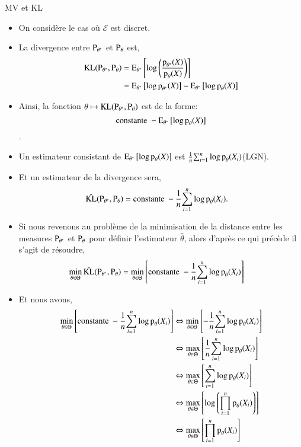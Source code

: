 \begin{frame}
    [allowframebreaks]{MV et KL}
    \begin{itemize}
        \item On considère le cas où $\mathcal{E}$ est discret.
        \item La divergence entre $\operatorname{P}_{\theta^*}$ et $\operatorname{P}_\theta$ est,
        \begin{align*}
            \operatorname{KL}( \operatorname{P}_{\theta^*}, \operatorname{P}_\theta)&=
            \operatorname{E}_{\theta^*}\left[\log\left(\frac{\operatorname{p}_{\theta^*}(X)}{\operatorname{p}_\theta(X)}\right)\right]\\
            &=\operatorname{E}_{\theta^*}\left[\log\operatorname{p}_{\theta^*}(X)\right] - \operatorname{E}_{\theta^*}\left[\log\operatorname{p}_{\theta}(X)\right]
        \end{align*}
        \framebreak
        \item Ainsi, la fonction $\theta\mapsto \operatorname{KL}( \operatorname{P}_{\theta^*}, \operatorname{P}_\theta)$ est de la forme: 
        \[\textrm{constante} \ - \operatorname{E}_{\theta^*}\left[\log\operatorname{p}_{\theta}(X)\right]\].
        \item Un estimateur consistant de $\operatorname{E}_{\theta^*}\left[\log\operatorname{p}_{\theta}(X)\right]$ est 
        $\frac{1}{n}{\sum_{i=1}^n}\log\operatorname{p}_\theta(X_i)$(LGN).
        \framebreak
        \item Et un estimateur de la divergence sera,
        \begin{align*}
            \hat{\operatorname{KL}}(\operatorname{P}_{\theta^*}, \operatorname{P}_\theta)&= \textrm{constante} \ - \frac{1}{n}{\sum_{i=1}^n}\log\operatorname{p}_\theta(X_i).
        \end{align*}
        \framebreak
        \item Si nous revenons au problème de la minimisation de la distance entre les measures $\operatorname{P}_{\theta^*}$ et $\operatorname{P}_\theta$
     pour définir l'estimateur $\hat{\theta}$, alors d'après ce qui précède il s'agit de résoudre,
    \begin{align*}
        \min_{\theta\in\Theta}\hat{\operatorname{KL}}(\operatorname{P}_{\theta^*}, \operatorname{P}_\theta) 
        &= \min_{\theta\in\Theta}\left[\textrm{constante} \ - \frac{1}{n}{\sum_{i=1}^n}\log\operatorname{p}_\theta(X_i)\right]
    \end{align*}
    \framebreak
    \item Et nous avons,
    \begin{align*}
        \min_{\theta\in\Theta}\left[\textrm{constante} \ - \frac{1}{n}{\sum_{i=1}^n}\log\operatorname{p}_\theta(X_i)\right]
        &\Leftrightarrow \min_{\theta\in\Theta}\left[- \frac{1}{n}{\sum_{i=1}^n}\log\operatorname{p}_\theta(X_i)\right]\\
        &\Leftrightarrow \max_{\theta\in\Theta}\left[\frac{1}{n}{\sum_{i=1}^n}\log\operatorname{p}_\theta(X_i)\right]\\
        &\Leftrightarrow \max_{\theta\in\Theta}\left[{\sum_{i=1}^n}\log\operatorname{p}_\theta(X_i)\right]\\
        &\Leftrightarrow \max_{\theta\in\Theta}\left[\log\left(\underset{i=1}{\overset{n}{\prod}}\operatorname{p}_\theta(X_i)\right)\right]\\
        &\Leftrightarrow \max_{\theta\in\Theta}\left[\underset{i=1}{\overset{n}{\prod}}\operatorname{p}_\theta(X_i)\right]
    \end{align*}
    

\end{itemize}
\end{frame}
